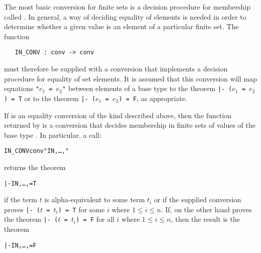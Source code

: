The%
 most basic
conversion for finite sets is a decision procedure for membership called
.  In general, a way of deciding equality of elements is needed in
order to determine whether a given value is an element of a particular finite
set.  The function

\begin{hol}\begin{verbatim}
   IN_CONV : conv -> conv
\end{verbatim}\end{hol}

\noindent must therefore be supplied with a conversion that implements a
decision procedure for equality of set elements.  It is assumed that this
conversion will map equations {\small\tt"$e_1$ = $e_2$"} between elements of a
base type  to the theorem {\small\tt |- ($e_1$ = $e_2$) = T} or to the
theorem {\small\tt |- ($e_1$ = $e_2$) = F}, as appropriate.

If  is an equality conversion of the kind described above, then the
function returned by  is a conversion that decides membership
in finite sets of values of the base type .  In particular, a call:

\begin{hol}\begin{alltt}
   IN\_CONV conv " IN \lb{},\dots,\rb"
\end{alltt}\end{hol}

\noindent returns the theorem

\begin{hol}\begin{alltt}
   |-  IN \lb{},\dots,\rb = T
\end{alltt}\end{hol}

\noindent if the term $t$ is alpha-equivalent to some term $t_i$ or if the
supplied conversion  proves {\tt |- ($t$ = $t_i$) = T} for some $i$
where $1 \leq i \leq n$.  If, on the other hand  proves the theorem
{\tt |- ($t$ = $t_i$) = F} for all $i$ where $1 \leq i \leq n$, then the result
is the theorem

\begin{hol}\begin{alltt}
   |-  IN \lb{},\dots,\rb = F
\end{alltt}\end{hol}

